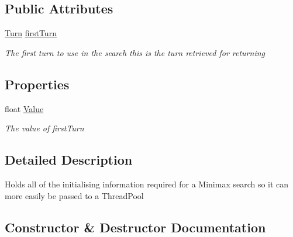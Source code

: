 \subsection*{Public Attributes}
\begin{DoxyCompactItemize}
\item 
\hyperlink{class_universal_turn_based_a_i_1_1_turn}{Turn} \hyperlink{class_universal_turn_based_a_i_1_1_minimax_worker_ac4ce50aa90e42a8702e5ad783a35f05b}{first\+Turn}
\begin{DoxyCompactList}\small\item\em The first turn to use in the search this is the turn retrieved for returning \end{DoxyCompactList}\end{DoxyCompactItemize}
\subsection*{Properties}
\begin{DoxyCompactItemize}
\item 
float \hyperlink{class_universal_turn_based_a_i_1_1_minimax_worker_aba59322c19f8226090dfaf8d7b5d8737}{Value}
\begin{DoxyCompactList}\small\item\em The value of {\itshape first\+Turn}  \end{DoxyCompactList}\end{DoxyCompactItemize}


\subsection{Detailed Description}
Holds all of the initialising information required for a Minimax search so it can more easily be passed to a Thread\+Pool 



\subsection{Constructor \& Destructor Documentation}
\hypertarget{class_universal_turn_based_a_i_1_1_minimax_worker_a82bd3b80cb0061eba98ca52eae4c2114}{}
